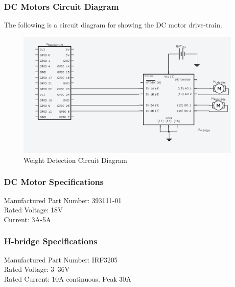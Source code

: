 \documentclass [10pt]{article}
\begin{document}

\subsubsection{DC Motors Circuit Diagram}
The following is a circuit diagram for showing the DC motor drive-train.
\begin{figure} [h!]
	\centering
	\includegraphics [scale = 0.4] {Figures/H_Bridge.png}
	\caption{Weight Detection Circuit Diagram}
\end{figure}


\subsubsection{DC Motor Specifications}
Manufactured Part Number: 393111-01\\
Rated Voltage: 18V\\
Current: 3A-5A\\


\subsubsection{H-bridge Specifications}
Manufactured Part Number:  IRF3205\\
Rated Voltage: 3~36V \\
Rated Current: 10A continuous, Peak 30A \\
\end{document}
